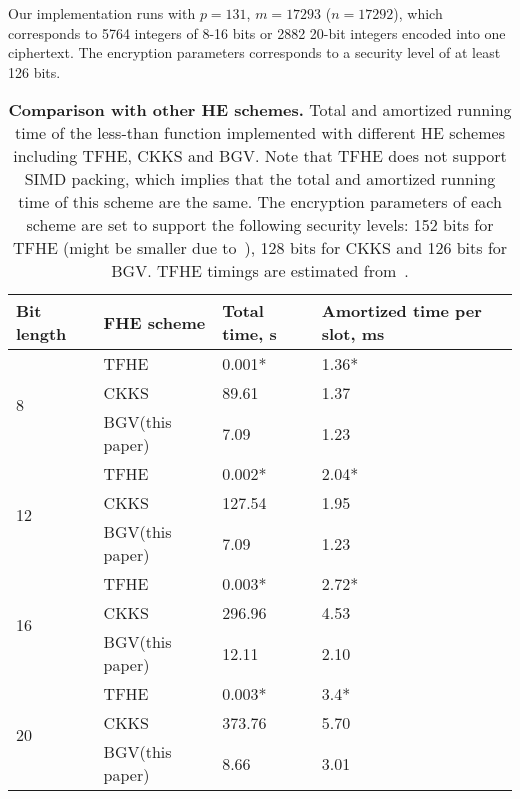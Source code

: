     Our implementation runs with $p=131$, $m=17293$ ($n=17292$), which corresponds to 5764 integers of 8-16 bits or 2882 20-bit integers encoded into one ciphertext.
    The encryption parameters corresponds to a security level of at least 126 bits.

    \begin{table}[h]
      \centering
      \begin{tabular*}{.45\textwidth}{ p{1.2cm} p{2.1cm} p{1.0cm} p{2cm}}
        \toprule
        Bit length  & FHE scheme & Total time, s    & Amortized time per slot, ms \\
        \midrule
        \multirow{3}{*}{8}  & TFHE              & 0.001*     & 1.36* \\
                            & CKKS              & 89.61     & 1.37 \\
                            & BGV(this paper)   & 7.09      & 1.23 \\
        \midrule
        \multirow{3}{*}{12}  & TFHE             & 0.002*     & 2.04* \\
                             & CKKS             & 127.54    & 1.95 \\
                             & BGV(this paper)  & 7.09      & 1.23 \\
        \midrule
        \multirow{3}{*}{16}  & TFHE            & 0.003*     & 2.72* \\
                             & CKKS            & 296.96     & 4.53 \\
                             & BGV(this paper)  & 12.11      & 2.10 \\
        \midrule
        \multirow{3}{*}{20}  & TFHE            & 0.003*      & 3.4* \\
                             & CKKS            & 373.76     & 5.70 \\
                             & BGV(this paper)   & 8.66     &  3.01\\ 
        \bottomrule
      \end{tabular*}
      \caption{\textbf{Comparison with other HE schemes.} Total and amortized running time of the less-than function implemented with different HE schemes including TFHE, CKKS and BGV. Note that TFHE does not support SIMD packing, which implies that the total and amortized running time of this scheme are the same. The encryption parameters of each scheme are set to support the following security levels: 152 bits for TFHE (might be smaller due to~\cite{EPRINT:EJK20}), 128 bits for CKKS and 126 bits for BGV.
      \newline *TFHE timings are estimated from~\cite{JC:CGGI20}.}
      \label{table:other_he_schemes}
    \end{table}
    
